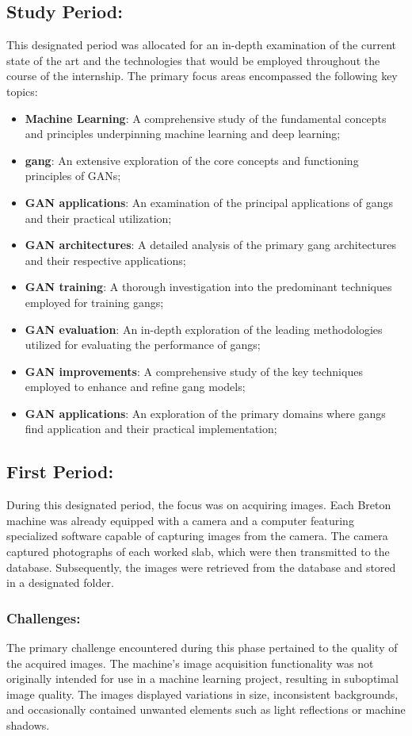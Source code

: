 \subsection{Study Period:}
This designated period was allocated for an in-depth examination of the current state of the art and the technologies that would be employed throughout the course of the internship. 
The primary focus areas encompassed the following key topics:
\begin{itemize}
    \item \textbf{Machine Learning}: A comprehensive study of the fundamental concepts and principles underpinning machine learning and deep learning;
    \item \textbf{\gls{gang}}: An extensive exploration of the core concepts and functioning principles of GANs;
    \item \textbf{GAN applications}: An examination of the principal applications of \gls{gang}s and their practical utilization;
    \item \textbf{GAN architectures}: A detailed analysis of the primary \gls{gang} architectures and their respective applications;
    \item \textbf{GAN training}: A thorough investigation into the predominant techniques employed for training \gls{gang}s;\@
    \item \textbf{GAN evaluation}: An in-depth exploration of the leading methodologies utilized for evaluating the performance of \gls{gang}s;\@
    \item \textbf{GAN improvements}: A comprehensive study of the key techniques employed to enhance and refine \gls{gang} models;\@
    \item \textbf{GAN applications}:  An exploration of the primary domains where \gls{gang}s find application and their practical implementation;
\end{itemize}
\subsection{First Period:}
During this designated period, the focus was on acquiring images. 
Each Breton machine was already equipped with a camera and a computer featuring specialized software capable of capturing images from the camera. 
The camera captured photographs of each worked slab, which were then transmitted to the database. 
Subsequently, the images were retrieved from the database and stored in a designated folder.
\subsubsection{Challenges:}
The primary challenge encountered during this phase pertained to the quality of the acquired images. 
The machine's image acquisition functionality was not originally intended for use in a machine learning project, resulting in suboptimal image quality. 
The images displayed variations in size, inconsistent backgrounds, and occasionally contained unwanted elements such as light reflections or machine shadows.
